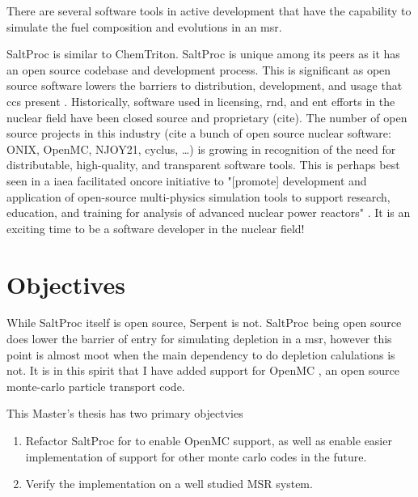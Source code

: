 %
%
%

There are several software tools in active development that have the capability to simulate the fuel composition and evolutions in an \Gls{msr}.


SaltProc is similar to ChemTriton. SaltProc is unique among its peers as it has an open source codebase and development process. This is significant as open source software lowers the barriers to distribution, development, and usage that \Gls{cc}s present \cite{fiorina_initiative_2021}. Historically, software used in licensing, \Gls{rnd}, and \Gls{ent} efforts in the nuclear field have been closed source and proprietary (cite). The number of open source projects in this industry (cite a bunch of open source nuclear software:
ONIX, OpenMC, NJOY21, cyclus, \ldots) is growing in recognition of the need for distributable, high-quality, and transparent software tools. This is perhaps best seen in a \Gls{iaea} facilitated \Gls{oncore} initiative to "[promote] development and application of open-source multi-physics simulation tools to support research, education, and training for analysis of advanced nuclear power reactors" \cite{iaea_open-source}. It is an exciting time to be a software developer in the nuclear field!

\section{Objectives}%
\label{sec:objectives}

While SaltProc itself is open source, Serpent is not. SaltProc being open source does lower the barrier of entry for simulating depletion in a \Gls{msr}, however this point is almost moot when the main dependency to do depletion calulations is not. It is in this spirit that I have added support for OpenMC \cite{romano_openmc_2015}, an open source monte-carlo particle transport code.

This Master's thesis has two primary objectvies
\begin{enumerate}
    \item Refactor SaltProc for to enable OpenMC support, as well as enable easier implementation of support for other monte carlo codes in the future. 
    \item Verify the implementation on a well studied MSR system.
\end{enumerate}


